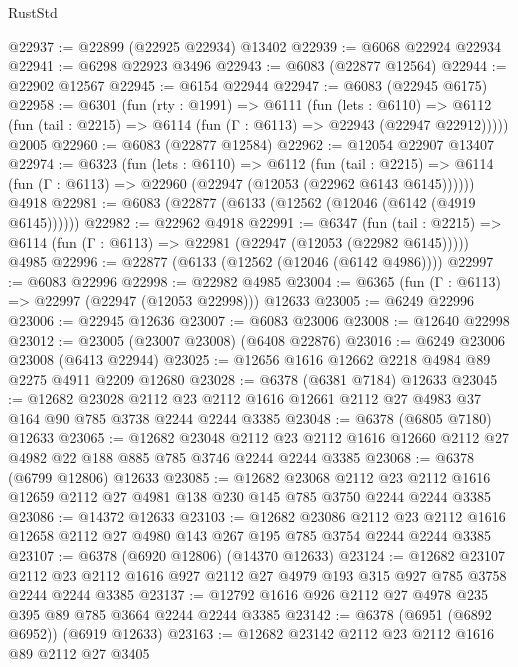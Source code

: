 \begin{lexlean}{RustStd}
\begin{coremodule}
@22937 := @22899 (@22925 @22934) @13402
@22939 := @6068 @22924 @22934
@22941 := @6298 @22923 @3496
@22943 := @6083 (@22877 @12564)
@22944 := @22902 @12567
@22945 := @6154 @22944
@22947 := @6083 (@22945 @6175)
@22958 := @6301
    (fun (rty : @1991) =>
    @6111
      (fun (lets : @6110) =>
      @6112 (fun (tail : @2215) => @6114 (fun (Γ : @6113) => @22943 (@22947 @22912)))))
    @2005
@22960 := @6083 (@22877 @12584)
@22962 := @12054 @22907 @13407
@22974 := @6323
    (fun (lets : @6110) =>
    @6112
      (fun (tail : @2215) =>
      @6114 (fun (Γ : @6113) => @22960 (@22947 (@12053 (@22962 @6143 @6145))))))
    @4918
@22981 := @6083 (@22877 (@6133 (@12562 (@12046 (@6142 (@4919 @6145))))))
@22982 := @22962 @4918
@22991 := @6347
    (fun (tail : @2215) => @6114 (fun (Γ : @6113) => @22981 (@22947 (@12053 (@22982 @6145)))))
    @4985
@22996 := @22877 (@6133 (@12562 (@12046 (@6142 @4986))))
@22997 := @6083 @22996
@22998 := @22982 @4985
@23004 := @6365 (fun (Γ : @6113) => @22997 (@22947 (@12053 @22998))) @12633
@23005 := @6249 @22996
@23006 := @22945 @12636
@23007 := @6083 @23006
@23008 := @12640 @22998
@23012 := @23005 (@23007 @23008) (@6408 @22876)
@23016 := @6249 @23006 @23008 (@6413 @22944)
@23025 := @12656 @1616 @12662 @2218 @4984 @89 @2275 @4911 @2209 @12680
@23028 := @6378 (@6381 @7184) @12633
@23045 := @12682
    @23028
    @2112
    @23
    @2112
    @1616
    @12661
    @2112
    @27
    @4983
    @37
    @164
    @90
    @785
    @3738
    @2244
    @2244
    @3385
@23048 := @6378 (@6805 @7180) @12633
@23065 := @12682
    @23048
    @2112
    @23
    @2112
    @1616
    @12660
    @2112
    @27
    @4982
    @22
    @188
    @885
    @785
    @3746
    @2244
    @2244
    @3385
@23068 := @6378 (@6799 @12806) @12633
@23085 := @12682
    @23068
    @2112
    @23
    @2112
    @1616
    @12659
    @2112
    @27
    @4981
    @138
    @230
    @145
    @785
    @3750
    @2244
    @2244
    @3385
@23086 := @14372 @12633
@23103 := @12682
    @23086
    @2112
    @23
    @2112
    @1616
    @12658
    @2112
    @27
    @4980
    @143
    @267
    @195
    @785
    @3754
    @2244
    @2244
    @3385
@23107 := @6378 (@6920 @12806) (@14370 @12633)
@23124 := @12682
    @23107
    @2112
    @23
    @2112
    @1616
    @927
    @2112
    @27
    @4979
    @193
    @315
    @927
    @785
    @3758
    @2244
    @2244
    @3385
@23137 := @12792 @1616 @926 @2112 @27 @4978 @235 @395 @89 @785 @3664 @2244 @2244 @3385
@23142 := @6378 (@6951 (@6892 @6952)) (@6919 @12633)
@23163 := @12682
    @23142
    @2112
    @23
    @2112
    @1616
    @89
    @2112
    @27
    @3405

\end{coremodule}
\end{lexlean}
